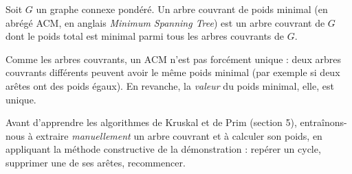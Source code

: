 \documentclass[11pt]{article}
\newcommand{\cle}[1]{{\popxbold\color{popdark}#1}}
\begin{document}
\begin{definition}
Soit $G$ un graphe connexe pondéré. Un \cle{arbre couvrant de poids minimal} (en abrégé \cle{ACM}, en anglais \emph{Minimum Spanning Tree}) est un arbre couvrant de $G$ dont le poids total est minimal parmi tous les arbres couvrants de $G$.
\end{definition}

\begin{attention}
Comme les arbres couvrants, un ACM n'est pas forcément unique : deux arbres couvrants différents peuvent avoir le même poids minimal (par exemple si deux arêtes ont des poids égaux). En revanche, la \emph{valeur} du poids minimal, elle, est unique.
\end{attention}

Avant d'apprendre les algorithmes de Kruskal et de Prim (section 5), entraînons-nous à extraire \emph{manuellement} un arbre couvrant et à calculer son poids, en appliquant la méthode constructive de la démonstration : repérer un cycle, supprimer une de ses arêtes, recommencer.
\end{document}
